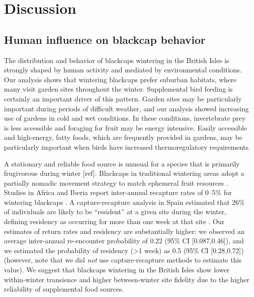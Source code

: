 \documentclass[a4paper, twoside]{templates/ociamthesis}
\begin{document}
\hypertarget{discussion}{%
\section{Discussion}\label{discussion}}

\hypertarget{human-influence-on-blackcap-behavior}{%
\subsection{Human influence on blackcap behavior}\label{human-influence-on-blackcap-behavior}}

The distribution and behavior of blackcaps wintering in the British Isles is strongly shaped by human activity and mediated by environmental conditions. Our analysis shows that wintering blackcaps prefer suburban habitats, where many visit garden sites throughout the winter. Supplemental bird feeding is certainly an important driver of this pattern. Garden sites may be particularly important during periods of difficult weather, and our analysis showed increasing use of gardens in cold and wet conditions. In these conditions, invertebrate prey is less accessible and foraging for fruit may be energy intensive. Easily accessible and high-energy, fatty foods, which are frequently provided in gardens, may be particularly important when birds have increased thermoregulatory requirements.

A stationary and reliable food source is unusual for a species that is primarily frugivorous during winter {[}ref{]}. Blackcaps in traditional wintering areas adopt a partially nomadic movement strategy to match ephemeral fruit resources \autocite{beldaResidentTransientDynamics2007,cuadradoYearYearRecurrence1992}. Studies in Africa and Iberia report inter-annual recapture rates of 0--5\% for wintering blackcaps \autocite{cuadradoAllBlackcapsSylvia1995,cuadradoYearYearRecurrence1992,kingSiteFidelityRecurrence2001,loveiMigrationWinteringBlackcap1985}. A capture-recapture analysis in Spain estimated that 26\% of individuals are likely to be ``resident'' at a given site during the winter, defining residency as occurring for more than one week at that site \autocite{beldaResidentTransientDynamics2007}. Our estimates of return rates and residency are substantially higher: we observed an average inter-annual re-encounter probability of 0.22 (95\% CI {[}0.087,0.46{]}), and we estimated the probability of residency (\textgreater1 week) as 0.5 (95\% CI {[}0.28,0.72{]}) (however, note that we did \emph{not} use capture-recapture methods to estimate this value). We suggest that blackcaps wintering in the British Isles show lower within-winter transience and higher between-winter site fidelity due to the higher reliability of supplemental food sources.
\end{document}
